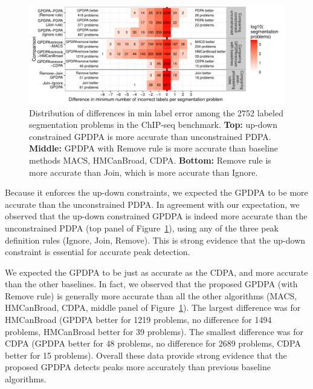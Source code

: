 \documentclass[twoside,11pt]{article}
\begin{document}
\begin{figure}
  \centering
  \includegraphics[width=\textwidth]{figure-PDPA-infeasible-error-compare}
  \vspace{-1cm}
  \caption{Distribution of differences in min label error among the
    2752 labeled segmentation problems in the ChIP-seq benchmark. 
    \textbf{Top:} up-down constrained GPDPA is more accurate than
    unconstrained PDPA. \textbf{Middle:} GPDPA with Remove
    rule is more accurate than baseline methods MACS, HMCanBroad,
    CDPA. \textbf{Bottom:} Remove rule is more accurate than 
    Join, which is more accurate than Ignore.}
  \label{fig:PDPA-infeasible-error-compare}
\end{figure} 



Because it enforces the up-down constraints, we expected the GPDPA to
be more accurate than the unconstrained PDPA. In agreement with our
expectation, we observed that the up-down constrained GPDPA is indeed
more accurate than the unconstrained PDPA (top panel of
Figure~\ref{fig:PDPA-infeasible-error-compare}), using
any of the three peak definition rules (Ignore, Join, Remove). This is
strong evidence that the up-down constraint is essential for accurate
peak detection.

We expected the GPDPA to be just as accurate as the CDPA, and more
accurate than the other baselines. In fact, we observed that the
proposed GPDPA (with Remove rule) is generally more accurate than all
the other algorithms (MACS, HMCanBroad, CDPA, middle panel of
Figure~\ref{fig:PDPA-infeasible-error-compare}). The largest
difference was for HMCanBroad (GPDPA better for 1219 problems, no
difference for 1494 problems, HMCanBroad better for 39 problems). The
smallest difference was for CDPA (GPDPA better for 48 problems, no
difference for 2689 problems, CDPA better for 15 problems). Overall these data provide strong evidence that the proposed GPDPA detects peaks more
accurately than previous baseline algorithms.
\end{document}
